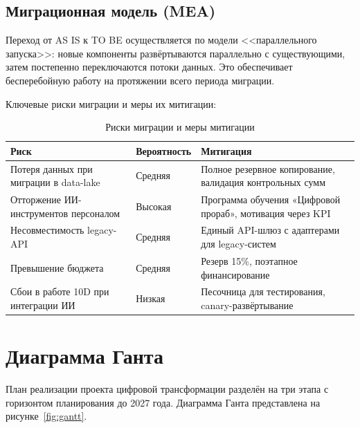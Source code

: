 \documentclass[12pt,a4paper]{article}
\begin{document}
\subsection{Миграционная модель (MEA)}

Переход от AS IS к TO BE осуществляется по модели <<параллельного запуска>>: новые компоненты развёртываются параллельно с существующими, затем постепенно переключаются потоки данных. Это обеспечивает бесперебойную работу на протяжении всего периода миграции.

Ключевые риски миграции и меры их митигации:

\begin{table}[H]
\centering
\caption{Риски миграции и меры митигации}
\label{tab:risks}
\small
\begin{tabularx}{\textwidth}{|X|l|X|}
\hline
\rowcolor{samoletlight}
\textbf{Риск} & \textbf{Вероятность} & \textbf{Митигация} \\
\hline
Потеря данных при миграции в data-lake & Средняя & Полное резервное копирование, валидация контрольных сумм \\
\hline
Отторжение ИИ-инструментов персоналом & Высокая & Программа обучения «Цифровой прораб», мотивация через KPI \\
\hline
Несовместимость legacy-API & Средняя & Единый API-шлюз с адаптерами для legacy-систем \\
\hline
Превышение бюджета & Средняя & Резерв 15\%, поэтапное финансирование \\
\hline
Сбои в работе 10D при интеграции ИИ & Низкая & Песочница для тестирования, canary-развёртывание \\
\hline
\end{tabularx}
\end{table}

\newpage

\section{Диаграмма Ганта}

План реализации проекта цифровой трансформации разделён на три этапа с горизонтом планирования до 2027 года. Диаграмма Ганта представлена на рисунке~\ref{fig:gantt}.
\end{document}

